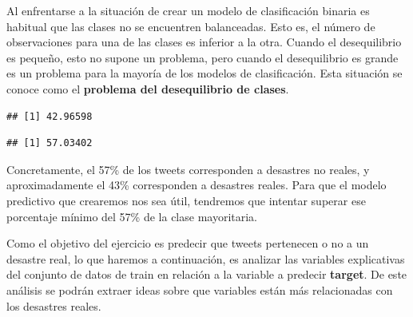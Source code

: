 \documentclass[]{article}
\newenvironment{Shaded}{\begin{snugshade}}{\end{snugshade}}
\newcommand{\DecValTok}[1]{\textcolor[rgb]{0.00,0.00,0.81}{#1}}
\newcommand{\KeywordTok}[1]{\textcolor[rgb]{0.13,0.29,0.53}{\textbf{#1}}}
\newcommand{\NormalTok}[1]{#1}
\newcommand{\OperatorTok}[1]{\textcolor[rgb]{0.81,0.36,0.00}{\textbf{#1}}}
\newcommand{\StringTok}[1]{\textcolor[rgb]{0.31,0.60,0.02}{#1}}
\begin{document}
\begin{tcolorbox}
	Al enfrentarse a la situación de crear un modelo de clasificación binaria es habitual que las clases no se encuentren balanceadas. Esto es, el número de observaciones para una de las clases es inferior a la otra. Cuando el desequilibrio es pequeño, esto no supone un problema, pero cuando el desequilibrio es grande es un problema para la mayoría de los modelos de clasificación. Esta situación se conoce como el \textbf{problema del desequilibrio de clases}.
\end{tcolorbox}

\vspace{3mm}

\begin{Shaded}
\end{Shaded}

\begin{verbatim}
## [1] 42.96598
\end{verbatim}

\begin{Shaded}
\end{Shaded}

\begin{verbatim}
## [1] 57.03402
\end{verbatim}

Concretamente, el 57\% de los tweets corresponden a desastres no reales, y aproximadamente el 43\% corresponden a desastres reales. Para que el modelo predictivo que crearemos nos sea útil, tendremos que intentar superar ese porcentaje mínimo del 57\% de la clase mayoritaria.

Como el objetivo del ejercicio es predecir que tweets pertenecen o no a un desastre real, lo que haremos a continuación, es analizar las variables explicativas del conjunto de datos de train en relación a la variable a predecir \textbf{target}. De este análisis se podrán extraer ideas sobre que variables están más relacionadas con los desastres reales.
\end{document}
